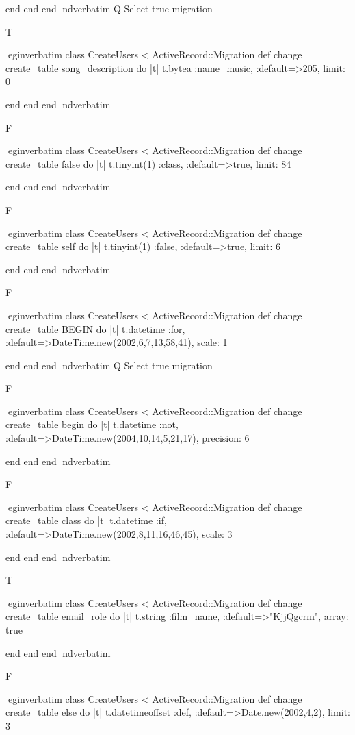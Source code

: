     end 
  end 
end
nd{verbatim}
Q
 Select true migration

T

egin{verbatim}
 class CreateUsers < ActiveRecord::Migration 
  def change 
    create_table song_description do |t| 
      t.bytea :name_music, :default=>205, limit: 0
    
    end 
  end 
end
nd{verbatim}

F

egin{verbatim}
 class CreateUsers < ActiveRecord::Migration 
  def change 
    create_table false do |t| 
      t.tinyint(1) :class, :default=>true, limit: 84
    
    end 
  end 
end
nd{verbatim}

F

egin{verbatim}
 class CreateUsers < ActiveRecord::Migration 
  def change 
    create_table self do |t| 
      t.tinyint(1) :false, :default=>true, limit: 6
    
    end 
  end 
end
nd{verbatim}

F

egin{verbatim}
 class CreateUsers < ActiveRecord::Migration 
  def change 
    create_table BEGIN do |t| 
      t.datetime :for, :default=>DateTime.new(2002,6,7,13,58,41), scale: 1
    
    end 
  end 
end
nd{verbatim}
Q
 Select true migration

F

egin{verbatim}
 class CreateUsers < ActiveRecord::Migration 
  def change 
    create_table begin do |t| 
      t.datetime :not, :default=>DateTime.new(2004,10,14,5,21,17), precision: 6
    
    end 
  end 
end
nd{verbatim}

F

egin{verbatim}
 class CreateUsers < ActiveRecord::Migration 
  def change 
    create_table class do |t| 
      t.datetime :if, :default=>DateTime.new(2002,8,11,16,46,45), scale: 3
    
    end 
  end 
end
nd{verbatim}

T

egin{verbatim}
 class CreateUsers < ActiveRecord::Migration 
  def change 
    create_table email_role do |t| 
      t.string :film_name, :default=>"KjjQgcrm", array: true
    
    end 
  end 
end
nd{verbatim}

F

egin{verbatim}
 class CreateUsers < ActiveRecord::Migration 
  def change 
    create_table else do |t| 
      t.datetimeoffset :def, :default=>Date.new(2002,4,2), limit: 3
    
